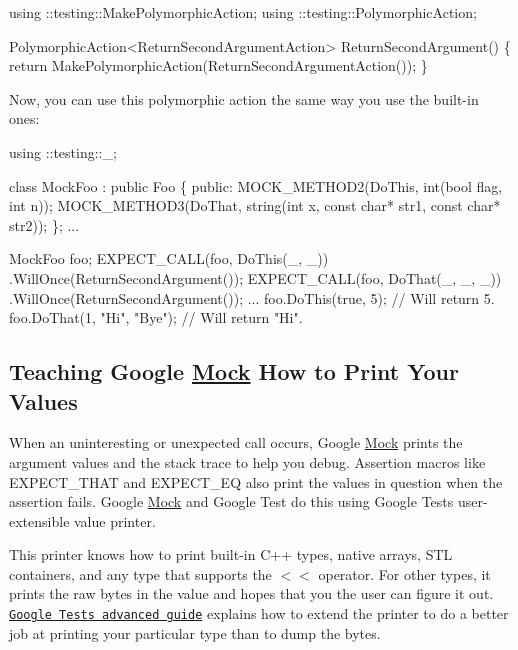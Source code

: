 \begin{DoxyCode}
using ::testing::MakePolymorphicAction;
using ::testing::PolymorphicAction;

PolymorphicAction<ReturnSecondArgumentAction> ReturnSecondArgument() \{
  return MakePolymorphicAction(ReturnSecondArgumentAction());
\}
\end{DoxyCode}


Now, you can use this polymorphic action the same way you use the built-\/in ones\+:


\begin{DoxyCode}
using ::testing::\_;

class MockFoo : public Foo \{
 public:
  MOCK\_METHOD2(DoThis, int(bool flag, int n));
  MOCK\_METHOD3(DoThat, string(int x, const char* str1, const char* str2));
\};
...

  MockFoo foo;
  EXPECT\_CALL(foo, DoThis(\_, \_))
      .WillOnce(ReturnSecondArgument());
  EXPECT\_CALL(foo, DoThat(\_, \_, \_))
      .WillOnce(ReturnSecondArgument());
  ...
  foo.DoThis(true, 5);         // Will return 5.
  foo.DoThat(1, "Hi", "Bye");  // Will return "Hi".
\end{DoxyCode}


\subsection*{Teaching Google \hyperlink{class_mock}{Mock} How to Print Your Values}

When an uninteresting or unexpected call occurs, Google \hyperlink{class_mock}{Mock} prints the argument values and the stack trace to help you debug. Assertion macros like {\ttfamily E\+X\+P\+E\+C\+T\+\_\+\+T\+H\+AT} and {\ttfamily E\+X\+P\+E\+C\+T\+\_\+\+EQ} also print the values in question when the assertion fails. Google \hyperlink{class_mock}{Mock} and Google Test do this using Google Test\textquotesingle{}s user-\/extensible value printer.

This printer knows how to print built-\/in C++ types, native arrays, S\+TL containers, and any type that supports the {\ttfamily $<$$<$} operator. For other types, it prints the raw bytes in the value and hopes that you the user can figure it out. \href{http://code.google.com/p/googletest/wiki/V1_6_AdvancedGuide#Teaching_Google_Test_How_to_Print_Your_Values}{\tt Google Test\textquotesingle{}s advanced guide} explains how to extend the printer to do a better job at printing your particular type than to dump the bytes. 